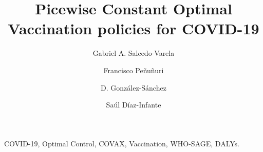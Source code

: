 \begin{frontmatter}
    \title{
        Picewise Constant Optimal Vaccination policies for COVID-19
    }
    \author[add:unison]%
    {Gabriel A. Salcedo-Varela}
    \address[add:unison]{
        Departamento de Matem\'aticas, Universidad de Sonora,
        Blvd. Luis Encinas y Rosales S/N,
        Hermosillo, Sonora, M\'exico, C.P. 83000.
    }
    \author[add:UADY]%
    {Francisco Pe\~nu\~nuri}
    \address[add:UADY]{Facultad de Ingenier\'ia, Universidad 
    Aut\'onoma de Yucat\'an, A.P. 150, Cordemex, M\'erida, Yucat\'an, 
    M\'exico.}
    \author[add:conacyt_unison]{D. Gonz\'alez-S\'anchez}
        \address[add:conacyt_unison]{
        CONACYT-Universidad de Sonora,
        Departamento de Matem\'aticas,
        Blvd. Luis Encinas y Rosales S/N,
        Hermosillo, Sonora, M\'exico, C.P. 83000.
    }
    \author[add:conacyt_unison]{%
        Sa\'ul D\'iaz-Infante%
    }%
    
    \begin{keyword}
        COVID-19, Optimal Control, COVAX,
        Vaccination, WHO-SAGE, DALYs.
    \end{keyword}
\end{frontmatter}